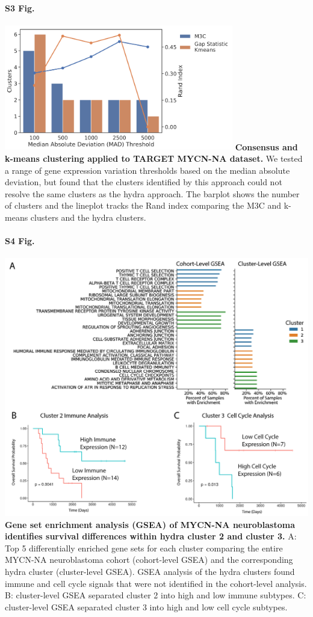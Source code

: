 \documentclass[10pt,letterpaper]{article}
\begin{document}
\paragraph*{S3 Fig.}
\includegraphics[width=0.75\textwidth]{img/clustering-screen}
\label{S3_Fig}
{\bf{Consensus and k-means clustering applied to TARGET MYCN-NA dataset.}} We tested a range of gene expression variation thresholds based on the median absolute deviation, but found that the clusters identified by this approach could not resolve the same clusters as the hydra approach. The barplot shows the number of clusters and the lineplot tracks the Rand index comparing the M3C and k-means clusters and the hydra clusters.

\paragraph*{S4 Fig.}
\includegraphics[width=\textwidth]{img/SubCluster-Analysis-V2@2x.png}
\label{S4_Fig} {\bf Gene set enrichment analysis (GSEA) of MYCN-NA neuroblastoma identifies survival differences within hydra cluster 2 and cluster 3.} A: Top 5 differentially enriched gene sets for each cluster comparing the entire MYCN-NA neuroblastoma cohort (cohort-level GSEA) and the corresponding hydra cluster (cluster-level GSEA). GSEA analysis of the hydra clusters found immune and cell cycle signals that were not identified in the cohort-level analysis. B: cluster-level GSEA separated cluster 2 into high and low immune subtypes. C: cluster-level GSEA separated cluster 3 into high and low cell cycle subtypes.
\end{document}
